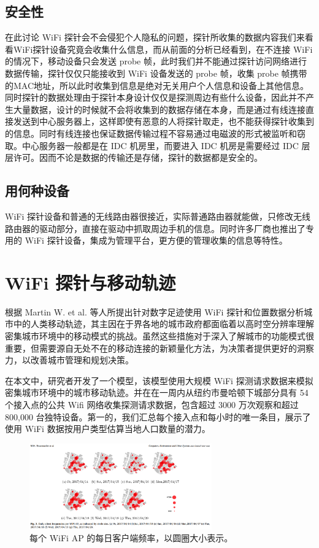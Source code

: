 \subsection{安全性}

在此讨论 WiFi 探针会不会侵犯个人隐私的问题，探针所收集的数据内容我们来看看WiFi探针设备究竟会收集什么信息，而从前面的分析已经看到，在不连接 WiFi 的情况下，移动设备只会发送 probe 帧，此时我们并不能通过探针访问网络进行数据传输，探针仅仅只能接收到 WiFi 设备发送的 probe 帧，收集 probe 帧携带的MAC地址，所以此时收集到信息是绝对无关用户个人信息和设备上其他信息。同时探针的数据处理由于探针本身设计仅仅是探测周边有些什么设备，因此并不产生大量数据，设计的时候就不会将收集到的数据存储在本身，而是通过有线连接直接发送到中心服务器上，这样即使有恶意的人将探针取走，也不能获得探针收集到的信息。同时有线连接也保证数据传输过程不容易通过电磁波的形式被监听和窃取。中心服务器一般都是在 IDC 机房里，而要进入 IDC 机房是需要经过 IDC 层层许可。因而不论是数据的传输还是存储，探针的数据都是安全的。

\subsection{用何种设备}

WiFi 探针设备和普通的无线路由器很接近，实际普通路由器就能做，只修改无线路由器的驱动部分，直接在驱动中抓取周边手机的信息。同时许多厂商也推出了专用的 WiFi 探针设备，集成为管理平台，更方便的管理收集的信息等特性。

\section{WiFi 探针与移动轨迹}

根据 Martin W. et al. 等人所提出针对数字足迹使用 WiFi 探针和位置数据分析城市中的人类移动轨迹，其主因在于界各地的城市政府都面临着以高时空分辨率理解密集城市环境中的移动模式的挑战。虽然这些措施对于深入了解城市的功能模式很重要，但需要源自无处不在的移动连接的新颖量化方法，为决策者提供更好的洞察力，以改善城市管理和规划决策。

在本文中，研究者开发了一个模型，该模型使用大规模 WiFi 探测请求数据来模拟密集城市环境中的城市移动轨迹。并在在一周内从纽约市曼哈顿下城部分具有 54 个接入点的公共 Wifi 网络收集探测请求数据，包含超过 3000 万次观察和超过 800,000 台独特设备。第一的，我们汇总每个接入点和每小时的唯一条目，展示了使用 WiFi 数据按用户类型估算当地人口数量的潜力。

\begin{figure}[htb]
\centering 
\includegraphics[width=0.70\textwidth]{img/newch1m16.png} 
\caption{每个 WiFi AP 的每日客户端频率，以圆圈大小表示。}
\label{Test}
\end{figure}

